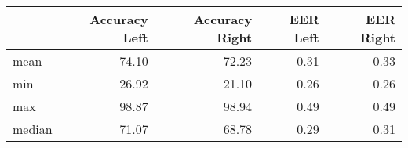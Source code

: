 \begin{tabular}{lrrrr}
\toprule
{} &  Accuracy Left &  Accuracy Right &  EER Left &  EER Right \\
\midrule
mean   &          74.10 &           72.23 &      0.31 &       0.33 \\
min    &          26.92 &           21.10 &      0.26 &       0.26 \\
max    &          98.87 &           98.94 &      0.49 &       0.49 \\
median &          71.07 &           68.78 &      0.29 &       0.31 \\
\bottomrule
\end{tabular}
